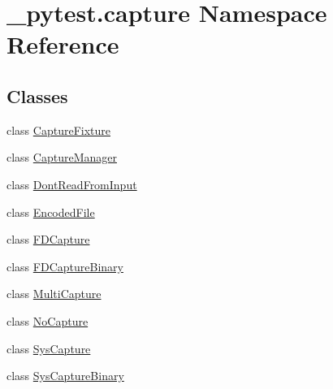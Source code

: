 \hypertarget{namespace__pytest_1_1capture}{}\section{\+\_\+pytest.\+capture Namespace Reference}
\label{namespace__pytest_1_1capture}
\subsection*{Classes}
\begin{DoxyCompactItemize}
\item 
class \hyperlink{class__pytest_1_1capture_1_1_capture_fixture}{Capture\+Fixture}
\item 
class \hyperlink{class__pytest_1_1capture_1_1_capture_manager}{Capture\+Manager}
\item 
class \hyperlink{class__pytest_1_1capture_1_1_dont_read_from_input}{Dont\+Read\+From\+Input}
\item 
class \hyperlink{class__pytest_1_1capture_1_1_encoded_file}{Encoded\+File}
\item 
class \hyperlink{class__pytest_1_1capture_1_1_f_d_capture}{F\+D\+Capture}
\item 
class \hyperlink{class__pytest_1_1capture_1_1_f_d_capture_binary}{F\+D\+Capture\+Binary}
\item 
class \hyperlink{class__pytest_1_1capture_1_1_multi_capture}{Multi\+Capture}
\item 
class \hyperlink{class__pytest_1_1capture_1_1_no_capture}{No\+Capture}
\item 
class \hyperlink{class__pytest_1_1capture_1_1_sys_capture}{Sys\+Capture}
\item 
class \hyperlink{class__pytest_1_1capture_1_1_sys_capture_binary}{Sys\+Capture\+Binary}
\end{DoxyCompactItemize}
